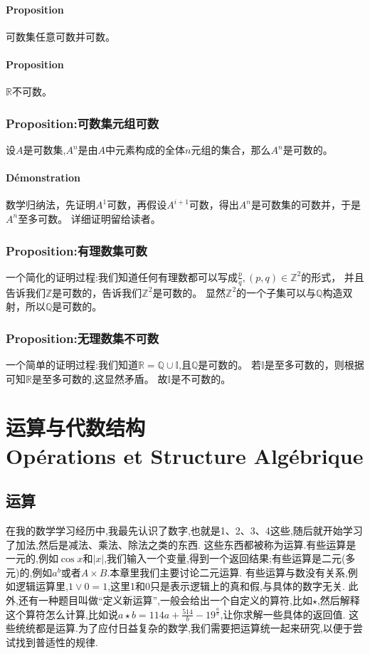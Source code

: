 \documentclass[12pt, a4paper, oneside]{ctexbook}
\begin{document}
  \subsubsection{Proposition}
  可数集任意可数并可数。
  \subsubsection{Proposition}
  $\mathbb{R}$不可数。
  \subsection{Proposition:可数集元组可数}\label{myref:Rnkeshu}
  设$A$是可数集,$A^n$是由$A$中元素构成的全体$n$元组的集合，那么$A^n$是可数的。
  \subsubsection{Démonstration}
  数学归纳法，先证明$A^1$可数，再假设$A^{i+1}$可数，得出$A^n$是可数集的可数并，于是$A^n$至多可数。
  详细证明留给读者。
  \subsection{Proposition:有理数集可数}
  一个简化的证明过程:我们知道任何有理数都可以写成$\frac{p}{q},(p,q)\in\mathbb{Z}^2$的形式，
  并且告诉我们$\mathbb{Z}$是可数的，告诉我们$\mathbb{Z}^2$是可数的。
  显然$\mathbb{Z}^2$的一个子集可以与$\mathbb{Q}$构造双射，所以$\mathbb{Q}$是可数的。

  \subsection{Proposition:无理数集不可数}
  一个简单的证明过程:我们知道$\mathbb{R}=\mathbb{Q}\cup\mathbb{I}$,且$\mathbb{Q}$是可数的。
  若$\mathbb{I}$是至多可数的，则根据可知$\mathbb{R}$是至多可数的,这显然矛盾。
  故$\mathbb{I}$是不可数的。



\chapter{运算与代数结构\\ Opérations et Structure Algébrique}
  
  \section{运算}
  在我的数学学习经历中,我最先认识了数字,也就是1、2、3、4这些,随后就开始学习了加法,然后是减法、乘法、除法之类的东西.
  这些东西都被称为运算.有些运算是一元的,例如$\cos x$和$|x|$,我们输入一个变量,得到一个返回结果;有些运算是二元(多元)的,例如$a^b$或者$A \times B$.本章里我们主要讨论二元运算.
  有些运算与数没有关系,例如逻辑运算里,$1\vee 0=1$,这里1和0只是表示逻辑上的真和假,与具体的数字无关.
  此外,还有一种题目叫做“定义新运算”,一般会给出一个自定义的算符,比如$\star $,然后解释这个算符怎么计算,比如说$a\star b=114a+\frac{514}{b}-19^{\frac{a}{b}}$,让你求解一些具体的返回值.
  这些统统都是运算.为了应付日益复杂的数学,我们需要把运算统一起来研究,以便于尝试找到普适性的规律.\label{myref:traditionalcalculate}
\end{document}
